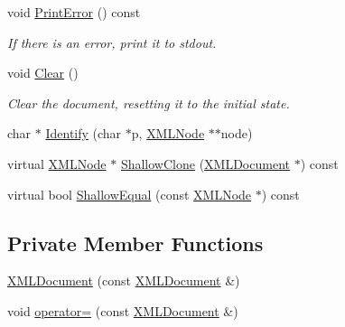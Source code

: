 \begin{DoxyCompactItemize}
void \hyperlink{classtinyxml2_1_1_x_m_l_document_a7545cc9a9a67eee9307c001aa316a388}{Print\-Error} () const 
\begin{DoxyCompactList}\small\item\em If there is an error, print it to stdout. \end{DoxyCompactList}\item 
void \hyperlink{classtinyxml2_1_1_x_m_l_document_a65656b0b2cbc822708eb351504178aaf}{Clear} ()
\begin{DoxyCompactList}\small\item\em Clear the document, resetting it to the initial state. \end{DoxyCompactList}\item 
char $\ast$ \hyperlink{classtinyxml2_1_1_x_m_l_document_a25827d1bec509ad566a107e5853ed040}{Identify} (char $\ast$p, \hyperlink{classtinyxml2_1_1_x_m_l_node}{X\-M\-L\-Node} $\ast$$\ast$node)
\item 
virtual \hyperlink{classtinyxml2_1_1_x_m_l_node}{X\-M\-L\-Node} $\ast$ \hyperlink{classtinyxml2_1_1_x_m_l_document_a57c8511ed9f83aa3e20909a3db3f83d0}{Shallow\-Clone} (\hyperlink{classtinyxml2_1_1_x_m_l_document}{X\-M\-L\-Document} $\ast$) const 
\item 
virtual bool \hyperlink{classtinyxml2_1_1_x_m_l_document_a12eac66c6e45d074d5cc47319868cd66}{Shallow\-Equal} (const \hyperlink{classtinyxml2_1_1_x_m_l_node}{X\-M\-L\-Node} $\ast$) const 
\end{DoxyCompactItemize}
\subsection*{Private Member Functions}
\begin{DoxyCompactItemize}
\item 
\hyperlink{classtinyxml2_1_1_x_m_l_document_adcea490db02a099d99440cd14a87d9e4}{X\-M\-L\-Document} (const \hyperlink{classtinyxml2_1_1_x_m_l_document}{X\-M\-L\-Document} \&)
\item 
void \hyperlink{classtinyxml2_1_1_x_m_l_document_aa542c2cf1276ee4bd778f16d196fe222}{operator=} (const \hyperlink{classtinyxml2_1_1_x_m_l_document}{X\-M\-L\-Document} \&)
\end{DoxyCompactItemize}
